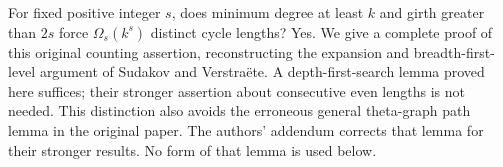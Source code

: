 For fixed positive integer $s$, does minimum degree at least $k$ and girth greater than $2s$ force $\Omega_s(k^s)$ distinct cycle lengths? Yes. We give a complete proof of this original counting assertion, reconstructing the expansion and breadth-first-level argument of Sudakov and Verstra\"ete. A depth-first-search lemma proved here suffices; their stronger assertion about consecutive even lengths is not needed.
This distinction also avoids the erroneous general theta-graph path lemma in the original paper. The authors' addendum corrects that lemma for their stronger results. No form of that lemma is used below.
